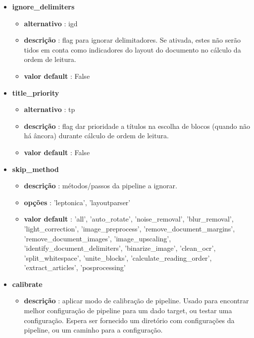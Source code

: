\begin{itemize}
	\item \textbf{ignore\_delimiters}
		\begin{itemize}\setlength\itemsep{-0.5em}
			\vspace{-1em}
			\item \textbf{alternativo} : igd
			\item \textbf{descrição} : flag para ignorar delimitadores. Se ativada, estes não serão tidos em conta como indicadores do layout do documento no cálculo da ordem de leitura.
			\item \textbf{valor default} : False
		\end{itemize}
		
	\item \textbf{title\_priority}
		\begin{itemize}\setlength\itemsep{-0.5em}
			\vspace{-1em}
			\item \textbf{alternativo} : tp
			\item \textbf{descrição} : flag dar prioridade a títulos na escolha de blocos (quando não há âncora) durante cálculo de ordem de leitura.
			\item \textbf{valor default} : False
		\end{itemize}
	
	\item \textbf{skip\_method}
		\begin{itemize}\setlength\itemsep{-0.5em}
			\vspace{-1em}
			\item \textbf{descrição} : métodos/passos da pipeline a ignorar.
			\item \textbf{opções} : 'leptonica', 'layoutparser'
			\item \textbf{valor default} : 'all', 'auto\_rotate', 'noise\_removal', 'blur\_removal', 'light\_correction', 'image\_preprocess', 'remove\_document\_margins', 'remove\_document\_images', 'image\_upscaling', 'identify\_document\_delimiters', 'binarize\_image', 'clean\_ocr', 'split\_whitespace', 'unite\_blocks', 'calculate\_reading\_order', 'extract\_articles', 'posprocessing'
		\end{itemize}
	
	\item \textbf{calibrate}
		\begin{itemize}\setlength\itemsep{-0.5em}
			\vspace{-1em}
			\item \textbf{descrição} : aplicar modo de calibração de pipeline. Usado para encontrar melhor configuração de pipeline para um dado target, ou testar uma configuração. Espera ser fornecido um diretório com configurações da pipeline, ou um caminho para a configuração.
		\end{itemize}
	

\end{itemize}
